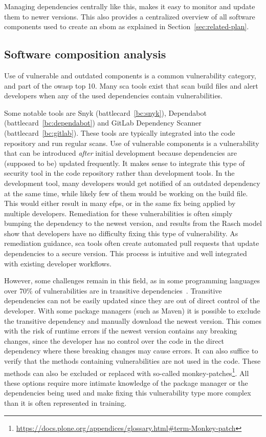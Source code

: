 Managing dependencies centrally like this, makes it easy to monitor and update them to newer versions.
This also provides a centralized overview of all software components used to create an \gls{sbom} as explained in Section~\ref{sec:related-plan}.

\subsection{Software composition analysis}
Use of vulnerable and outdated components is a common vulnerability category, and part of the \gls{owasp} top 10.
Many \gls{sca} tools exist that scan build files and alert developers when any of the used dependencies contain vulnerabilities.

Some notable tools are Snyk (battlecard~\ref{bc:snyk}), Dependabot (battlecard~\ref{bc:dependabot}) and GitLab Dependency Scanner (battlecard~\ref{bc:gitlab}).
These tools are typically integrated into the code repository and run regular scans.
Use of vulnerable components is a vulnerability that can be introduced \textit{after} initial development because dependencies are (supposed to be) updated frequently.
It makes sense to integrate this type of security tool in the code repository rather than development tools.
In the development tool, many developers would get notified of an outdated dependency at the same time, while likely few of them would be working on the build file.
This would either result in many \glspl{efp}, or in the same fix being applied by multiple developers.
Remediation for these vulnerabilities is often simply bumping the dependency to the newest version, and results from the Rasch model show that developers have no difficulty fixing this type of vulnerability.
As remediation guidance, \gls{sca} tools often create automated pull requests that update dependencies to a secure version.
This process is intuitive and well integrated with existing developer workflows.

However, some challenges remain in this field, as in some programming languages over 70\% of vulnerabilities are in transitive dependencies~\cite{snyk2020}.
Transitive dependencies can not be easily updated since they are out of direct control of the developer.
With some package managers (such as Maven) it is possible to exclude the transitive dependency and manually download the newest version.
This comes with the risk of runtime errors if the newest version contains any breaking changes, since the developer has no control over the code in the direct dependency where these breaking changes may cause errors.
It can also suffice to verify that the methods containing vulnerabilities are not used in the code.
These methods can also be excluded or replaced with so-called monkey-patches\footnote{\url{https://docs.plone.org/appendices/glossary.html\#term-Monkey-patch}}.
All these options require more intimate knowledge of the package manager or the dependencies being used and make fixing this vulnerability type more complex than it is often represented in training.